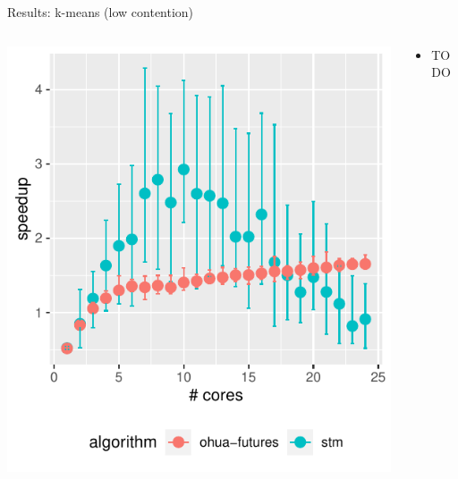 \documentclass[aspectratio=169, usenames, dvipsnames]{beamer}
\begin{document}
\begin{frame}{Results: k-means (low contention)}
    \begin{columns}%
        \begin{column}{0.5\textwidth}
            \centering
            \includegraphics[width=\textwidth,height=.65\textheight,keepaspectratio]{img/results/kmeans-low++}%
        \end{column}%
        \begin{column}{0.5\textwidth}
            \begin{itemize}
                \item TODO
            \end{itemize}
        \end{column}
    \end{columns}
\end{frame}
\end{document}
